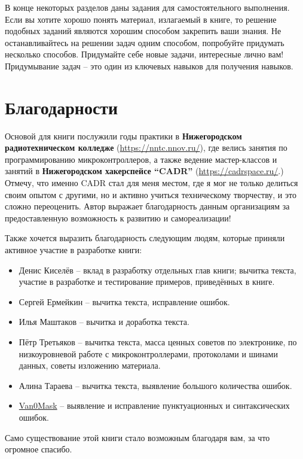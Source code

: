 \documentclass[../sparc.tex]{subfiles}
\begin{document}
В конце некоторых разделов даны задания для самостоятельного выполнения.  Если
вы хотите хорошо понять материал, излагаемый в книге, то решение подобных
заданий являются хорошим способом закрепить ваши знания.  Не останавливайтесь на
решении задач одним способом, попробуйте придумать несколько способов.
Придумайте себе новые задачи, интересные лично вам!  Придумывание задач -- это
один из ключевых навыков для получения навыков.

\section*{Благодарности}

Основой для книги послужили годы практики в \textbf{Нижегородском
  радиотехническом колледже} (\url{https://nntc.nnov.ru/}), где велись занятия
по программированию микроконтроллеров, а также ведение мастер-классов и занятий
в \textbf{Нижегородском хакерспейсе ``CADR''} (\url{https://cadrspace.ru/}.)
Отмечу, что именно CADR стал для меня местом, где я мог не только делиться своим
опытом с другими, но и активно учиться техническому творчеству, и это сложно
переоценить.  Автор выражает благодарность данным организациям за
предоставленную возможность к развитию и самореализации!

Также хочется выразить благодарность следующим людям, которые приняли активное
участие в разработке книги:
\begin{itemize}
\item Денис Киселёв -- вклад в разработку отдельных глав книги; вычитка текста,
  участие в разработке и тестирование примеров, приведённых в книге.
\item Сергей Ермейкин -- вычитка текста, исправление ошибок.
\item Илья Маштаков – вычитка и доработка текста.
\item Пётр Третьяков -- вычитка текста, масса ценных советов по электронике,
  по низкоуровневой работе с микроконтроллерами, протоколами и шинами данных,
  советы изложению материала.
\item Алина Тараева -- вычитка текста, выявление большого количества ошибок.
\item \href{https://github.com/V4n0M4sk}{Van0Mask} -- выявление и исправление
  пунктуационных и синтаксических ошибок.
\end{itemize}

Само существование этой книги стало возможным благодаря вам, за что огромное
спасибо.
\end{document}
